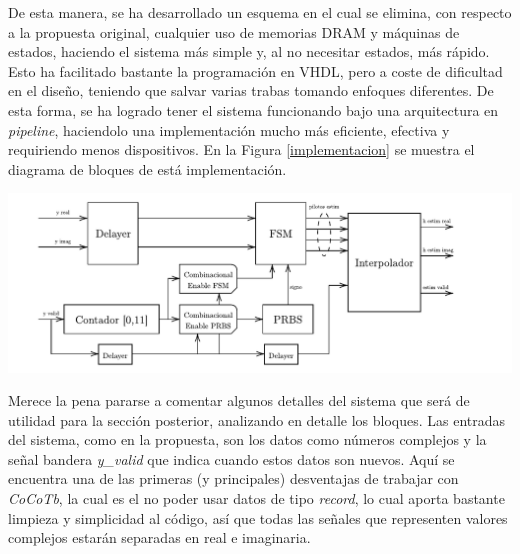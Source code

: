 \documentclass[11pt]{scrartcl} %
\begin{document}
\begin{preview}
De esta manera, se ha desarrollado un esquema en el cual se elimina, con respecto a la propuesta original, cualquier uso de memorias DRAM y máquinas de estados, haciendo el sistema más simple y, al no necesitar estados, más rápido. Esto ha facilitado bastante la programación en VHDL, pero a coste de dificultad en el diseño, teniendo que salvar varias trabas tomando enfoques diferentes. De esta forma, se ha logrado tener el sistema funcionando bajo una arquitectura en \emph{pipeline}, haciendolo una implementación mucho más eficiente, efectiva y requiriendo menos dispositivos. En la Figura \ref{implementacion} se muestra el diagrama de bloques de está implementación.


\begin{minipage}{\linewidth}
	\begin{center}
		\includegraphics[width=1\columnwidth,trim={0 0 1cm 0},clip]{./Figures/Diagrama1.pdf} %
	\end{center}
	\label{implementacion}
\end{minipage}

Merece la pena pararse a comentar algunos detalles del sistema que será de utilidad para la sección posterior, analizando en detalle los bloques. Las entradas del sistema, como en la propuesta, son los datos como números complejos y la señal bandera \emph{y\_valid} que indica cuando estos datos son nuevos. Aquí se encuentra una de las primeras (y principales) desventajas de trabajar con \emph{CoCoTb}, la cual es el no poder usar datos de tipo \emph{record}, lo cual aporta bastante limpieza y simplicidad al código, así que todas las señales que representen valores complejos estarán separadas en real e imaginaria.


\end{preview}
\end{document}
